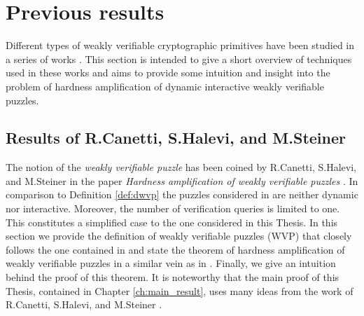 \section{Previous results}
\label{st:previous_results}
Different types of weakly verifiable cryptographic primitives have been studied in a series of works
\cite{canetti2004hardness, Dodis:2009:SAI:1530441.1530450, DBLP:journals/corr/abs-1002-3534}.
This section is intended to give a short overview of techniques used in these works
and aims to provide some intuition and insight into the problem of hardness amplification
of dynamic interactive weakly verifiable puzzles.
\subsection{Results of R.Canetti, S.Halevi, and M.Steiner}
\label{subsec:chs}
The notion of the \textit{weakly verifiable puzzle} has been coined by R.Canetti, S.Halevi, and M.Steiner in the paper
\textit{Hardness amplification of weakly verifiable puzzles} \cite{canetti2004hardness}.
In comparison to Definition \ref{def:dwvp} the puzzles considered in \cite{canetti2004hardness} are neither dynamic nor interactive.
Moreover, the number of verification queries is limited to one.
This constitutes a simplified case to the one considered in this Thesis.
In this section we provide the definition of weakly verifiable puzzles (WVP) that closely follows the one contained in \cite{canetti2004hardness}
and state the theorem of hardness amplification of weakly verifiable puzzles in a similar vein as in \cite{canetti2004hardness}.
Finally, we give an intuition behind the proof of this theorem.
It is noteworthy that the main proof of this Thesis, contained in Chapter \ref{ch:main_result},
uses many ideas from the work of R.Canetti, S.Halevi, and M.Steiner \cite{canetti2004hardness}.
%
